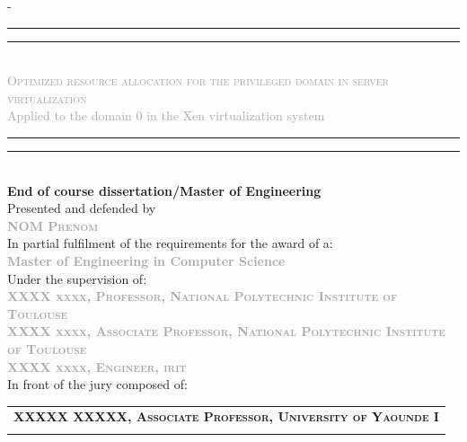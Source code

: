 \begin{titlingpage}
\begin{SingleSpace}
\begin{adjustwidth*}{\unitlength}{-\unitlength}
\begin{center}
\end{center}
\hspace{3cm}
\vspace{0.3cm}
\begin{center}
\rule[0.5ex]{\linewidth}{2pt}\vspace*{-\baselineskip}\vspace*{3.2pt}
\rule[0.5ex]{\linewidth}{1pt}\\[\baselineskip]
{\LARGE {\textcolor{darkgray}{\textsc{ Optimized resource allocation for the privileged domain in server virtualization }}
} }\\[4mm]
{\Large \textcolor{darkgray}{Applied to the domain 0 in the Xen virtualization system}}\\
\rule[0.5ex]{\linewidth}{1pt}\vspace*{-\baselineskip}\vspace{3.2pt}
\rule[0.5ex]{\linewidth}{2pt}\\
\vspace{4mm}
{\Large \textbf{End of course dissertation/Master of Engineering}}\\
\vspace{4mm}
{\Large Presented and defended by } \\
\vspace{4mm}
{\large \textsc{\textbf{\textcolor{darkgray}{NOM Prenom}}}}\\
\vspace{6mm}
{\Large In partial fulfilment of the requirements for the award of a:} \\
\vspace{4mm}
{\large \textbf{\textcolor{darkgray}{Master of Engineering in Computer Science}}}\\
\vspace{4mm}
{\Large Under the supervision of:}\\
\vspace{4mm}
{\normalsize \textsc{\textbf{\textcolor{darkgray}{XXXX xxxx, Professor, National Polytechnic Institute of Toulouse}}}}\\
\vspace{4.5mm}
{\normalsize \textsc{\textbf{\textcolor{darkgray}{XXXX xxxx, Associate Professor, National Polytechnic Institute of Toulouse}}}}\\
\vspace{4.5mm}
{\normalsize \textsc{\textbf{\textcolor{darkgray}{XXXX xxxx, Engineer, \acrlong{irit}}}}} \\
\vspace{4.5mm}
{\Large In front of the jury composed of:} \\
\vspace{4.5mm}
\begin{tabular}{>{\centering\arraybackslash}p{16cm}}
{\Large President:} \textbf{{\large \textsc{XXXXX XXXXX, Associate Professor, University of Yaounde I}}} \\ \\


\end{tabular}
\end{center}
\end{adjustwidth*}
\end{SingleSpace}
\end{titlingpage}
